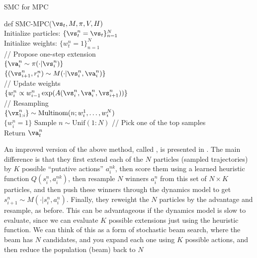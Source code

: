 \begin{algorithm}
\dontprintsemicolon
\caption{SMC for MPC}
\label{algo:SMCMPC}
def SMC-MPC($\vs_t, M, \pi,  V, H)$ \\
Initialize particles:  $\{\vs_t^n=\vs_t\}_{n=1}^N$ \\
Initialize weights: $\{w_t^n = 1\}_{n=1}^N$ \\
    {
      // Propose one-step extension \\
      $\{ \va_i^n \sim \pi(\cdot|\vs_i^n) \}$ \\
      $\{ (\vs_{i+1}^n, r_i^n) \sim M(\cdot | \vs_i^n, \va_i^n) \}$ \\
      // Update weights \\
      $\{ w_i^n \propto w_{i-1}^n \exp(A(\vs_i^n, \va_i^n, \vs_{i+1}^n)) \}$ \\
    // Resampling \\
    $\{ \vx_{1:i}^n \} \sim \text{Multinom}(n; w_i^1, \ldots, w_i^N)$ \\
    $\{ w_i^n = 1 \}$
    }
    Sample $n \sim \text{Unif}(1:N)$ // Pick one of the top samples \\
    Return $\va_t^n$ \\
\end{algorithm}


An improved version of the above method, called ,
is presented in \citep{Lioutas2022}.
The main difference is that  they first extend each of the $N$ particles
(sampled trajectories) by $K$ possible ``putative actions'' $a_i^{nk}$,
then score
them using a learned heuristic function $Q(s_i^n,a_i^{nk})$,
then resample $N$
winners $a_i^n$ from this set of $N \times K$ particles,
and then push these winners through the
dynamics model to get $s_{i+1}^n \sim M(\cdot|s_i^n,a_i^n)$.
Finally, they  reweight the $N$
particles by the advantage and resample, as before.
This can be advantageous  if the dynamics model is slow to evaluate,
since we can evaluate $K$ possible extensions just using the heuristic
function.
We can think of this as a form of stochastic beam search, where the beam
has $N$ candidates, and you expand each one using $K$ possible actions,
and then reduce the population  (beam) back to $N$



